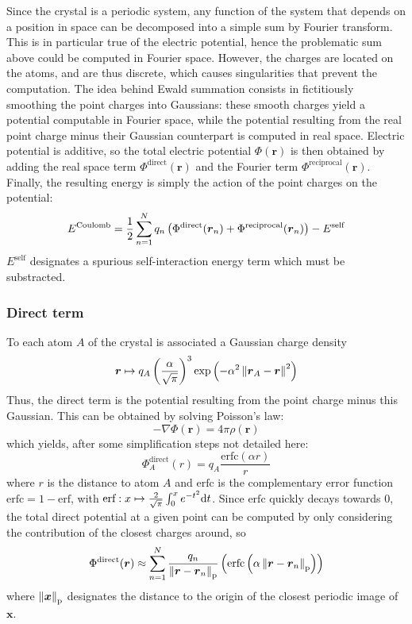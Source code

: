 \documentclass[main.tex]{subfiles}
\begin{document}
Since the crystal is a periodic system, any function of the system that depends on a position in space can be decomposed into a simple sum by Fourier transform. This is in particular true of the electric potential, hence the problematic sum above could be computed in Fourier space. However, the charges are located on the atoms, and are thus discrete, which causes singularities that prevent the computation. The idea behind Ewald summation consists in fictitiously smoothing the point charges into Gaussians: these smooth charges yield a potential computable in Fourier space, while the potential resulting from the real point charge minus their Gaussian counterpart is computed in real space. Electric potential is additive, so the total electric potential $\Phi(\boldsymbol r)$ is then obtained by adding the real space term $\Phi^\text{direct}(\boldsymbol r)$ and the Fourier term $\Phi^\text{reciprocal}(\boldsymbol r)$. Finally, the resulting energy is simply the action of the point charges on the potential:
\[E^\text{Coulomb} = \frac12\sum_{n=1}^N q_n\left(\Phi^\text{direct}(\boldsymbol r_n) + \Phi^\text{reciprocal}(\boldsymbol r_n)\right) - E^{\text{self}}\]
$E^{\text{self}}$ designates a spurious self-interaction energy term which must be substracted.

\subsubsection{Direct term}

To each atom $A$ of the crystal is associated a Gaussian charge density
\[\boldsymbol r\mapsto q_A\left(\frac\alpha{\sqrt\pi}\right)^3\exp\left(-\alpha^2\left\|\boldsymbol r_A - \boldsymbol r\right\|^2\right)\label{gaussian_charge}\]
Thus, the direct term is the potential resulting from the point charge minus this Gaussian. This can be obtained by solving Poisson's law:
\[-\nabla\Phi(\boldsymbol r) = 4\pi\rho(\boldsymbol r)\label{Poisson}\]
which yields, after some simplification steps not detailed here:
\[\Phi^\text{direct}_A(r) = q_A\frac{\text{erfc}(\alpha r)}r\]
where $r$ is the distance to atom $A$ and $\text{erfc}$ is the complementary error function $\text{erfc} = 1 - \text{erf}$, with $\text{erf}:x\mapsto\frac2{\sqrt\pi}\int_0^xe^{-t^2}\text dt$. Since $\text{erfc}$ quickly decays towards $0$, the total direct potential at a given point can be computed by only considering the contribution of the closest charges around, so
\[\Phi^\text{direct}(\boldsymbol r) \approx \sum_{n=1}^N \frac{q_n}{\left\|\boldsymbol r - \boldsymbol r_n\right\|_\text{p}}\left(\text{erfc}\left(\alpha \left\|\boldsymbol r - \boldsymbol r_n\right\|_\text{p}\right)\right)\]
where $\left\|\boldsymbol x\right\|_\text{p}$ designates the distance to the origin of the closest periodic image of $\boldsymbol x$.
\end{document}
